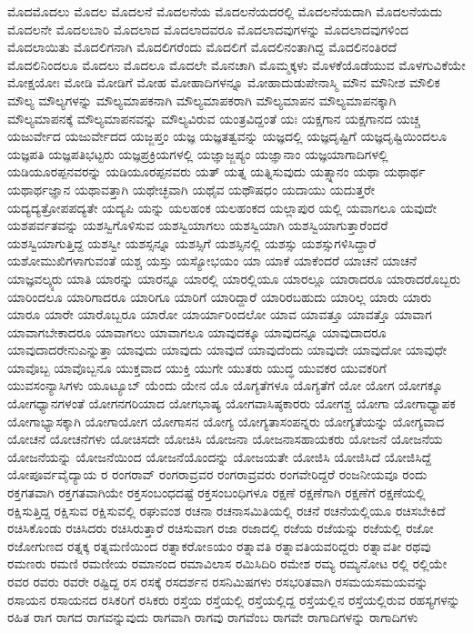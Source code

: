 {ಮೊದಮೊದಲು
ಮೊದಲ
ಮೊದಲನೆ
ಮೊದಲನೆಯ
ಮೊದಲನೆಯದರಲ್ಲಿ
ಮೊದಲನೆಯದಾಗಿ
ಮೊದಲನೆಯದು
ಮೊದಲನೇ
ಮೊದಲಬಾರಿ
ಮೊದಲಾದ
ಮೊದಲಾದವರೂ
ಮೊದಲಾದವುಗಳನ್ನು
ಮೊದಲಾದವುಗಳಿಂದ
ಮೊದಲಾಯಿತು
ಮೊದಲಿಗನಾಗಿ
ಮೊದಲಿಗರೆಂದು
ಮೊದಲಿಗೆ
ಮೊದಲಿನಂತಾಗಿದ್ದ
ಮೊದಲಿನಂತಿರದೆ
ಮೊದಲಿನಿಂದಲೂ
ಮೊದಲು
ಮೊದಲೂ
ಮೊದಲೇ
ಮೊನಚಾಗಿ
ಮೊಮ್ಮಕ್ಕಳು
ಮೊಳಕೆಯೊಡೆಯುವ
ಮೊಳಗುವಿಕೆಯೇ
ಮೋಕ್ಷಯೋಃ
ಮೋಡಿ
ಮೋಡಿಗೆ
ಮೋಹ
ಮೋಹಾದಿಗಳನ್ನೂ
ಮೋಹಾದುಡುಪೇನಾಸ್ಮಿ
ಮೌನ
ಮೌನೀಶ
ಮೌಲಿಕ
ಮೌಲ್ಯ
ಮೌಲ್ಯಗಳನ್ನು
ಮೌಲ್ಯಮಾಪಕನಾಗಿ
ಮೌಲ್ಯಮಾಪಕರಾಗಿ
ಮೌಲ್ಯಮಾಪನ
ಮೌಲ್ಯಮಾಪನಕ್ಕಾಗಿ
ಮೌಲ್ಯಮಾಪನಕ್ಕೆ
ಮೌಲ್ಯಮಾಪನವನ್ನು
ಮೌಲ್ಯವಿರುವ
ಯಂತ್ರವಿದ್ದಂತೆ
ಯಃ
ಯಕ್ಷಗಾನ
ಯಕ್ಷಗಾನದ
ಯಚ್ಚ
ಯಜುರ್ವೇದ
ಯಜುರ್ವೇದದ
ಯಜ್ಜಪ್ತಂ
ಯಜ್ಞ
ಯಜ್ಞತತ್ವವನ್ನು
ಯಜ್ಞದಲ್ಲಿ
ಯಜ್ಞದೃಷ್ಟಿಗೆ
ಯಜ್ಞದೃಷ್ಟಿಯಿಂದಲೂ
ಯಜ್ಞಪತಿ
ಯಜ್ಞಪತಿಭಟ್ಟರು
ಯಜ್ಞಪ್ರಕ್ರಿಯಗಳಲ್ಲಿ
ಯಜ್ಞಾಜ್ಜಪ್ಯಂ
ಯಜ್ಞಾನಾಂ
ಯಜ್ಞಯಾಗಾದಿಗಳಲ್ಲಿ
ಯಡಿಯೂರಪ್ಪನವರನ್ನು
ಯಡಿಯೂರಪ್ಪನವರು
ಯತ್
ಯತ್ನ
ಯತ್ನಿಸುವುದು
ಯತ್ಸ್ನಾನಂ
ಯಥಾ
ಯಥಾರ್ಥ
ಯಥಾರ್ಥಜ್ಞಾನ
ಯಥಾವತ್ತಾಗಿ
ಯಥೇಚ್ಛವಾಗಿ
ಯಥೈವ
ಯಥೌಷಧಂ
ಯದಾಯು
ಯದುತ್ತರೇ
ಯದ್ಯದ್ಯತ್ರೋಪಪದ್ಯತೇ
ಯದ್ಯಪಿ
ಯನ್ನು
ಯಲಹಂಕ
ಯಲಹಂಕದ
ಯಲ್ಲಾಪುರ
ಯಲ್ಲಿ
ಯವಾಗಲೂ
ಯವುದೇ
ಯಶಪರ್ವತವನ್ನು
ಯಶಸ್ವಿಗೊಳಿಸುವ
ಯಶಸ್ವಿಯಾಗಲು
ಯಶಸ್ವಿಯಾಗಿ
ಯಶಸ್ವಿಯಾಗುತ್ತಾರೆಂದರೆ
ಯಶಸ್ವಿಯಾಗುತ್ತಿದ್ದ
ಯಶಸ್ವೀ
ಯಶಸ್ಸನ್ನೂ
ಯಶಸ್ಸಿಗೆ
ಯಶಸ್ಸಿನಲ್ಲಿ
ಯಶಸ್ಸು
ಯಶಸ್ಸುಗಳಿಸಿದ್ದಾರೆ
ಯಶೋಮುಖಿಗಳಾಗುವಂತೆ
ಯಶ್ಚ
ಯಸ್ತು
ಯಸ್ಯೋಭಯಂ
ಯಾ
ಯಾಕೆ
ಯಾಕೆಂದರೆ
ಯಾಚನೆ
ಯಾಚನೆ
ಯಾಜ್ಞವಲ್ಕ್ಯರು
ಯಾತಿ
ಯಾರನ್ನು
ಯಾರನ್ನೂ
ಯಾರಲ್ಲಿ
ಯಾರಲ್ಲಿಯೂ
ಯಾರಲ್ಲೂ
ಯಾರಾದರೂ
ಯಾರಾದರೊಬ್ಬರು
ಯಾರಿಂದಲೂ
ಯಾರಿಗಾದರೂ
ಯಾರಿಗೂ
ಯಾರಿಗೆ
ಯಾರಿದ್ದಾರೆ
ಯಾರಿರಬಹುದು
ಯಾರಿಲ್ಲ
ಯಾರು
ಯಾರು
ಯಾರೂ
ಯಾರೇ
ಯಾರೊಬ್ಬರೂ
ಯಾರೋ
ಯಾರ್ಯಾರಿಂದಲೋ
ಯಾವ
ಯಾವತ್ತೂ
ಯಾವತ್ತೊ
ಯಾವಾಗ
ಯಾವಾಗಬೇಕಾದರೂ
ಯಾವಾಗಲು
ಯಾವಾಗಲೂ
ಯಾವುದಕ್ಕೂ
ಯಾವುದನ್ನೂ
ಯಾವುದಾದರೂ
ಯಾವುದಾದರೇನುಎನ್ನುತ್ತಾ
ಯಾವುದು
ಯಾವುದು
ಯಾವುದೆ
ಯಾವುದೆಂದು
ಯಾವುದೇ
ಯಾವುದೋ
ಯಾವುಧೇ
ಯಾವೊಬ್ಬ
ಯಾವೊಬ್ಬನೂ
ಯುಕ್ತವಾದ
ಯುಕ್ತಿ
ಯುಗೇ
ಯುತರು
ಯುದ್ಧ
ಯುವಕರ
ಯುವಕರಿಗೆ
ಯುವಸಂನ್ಯಾಸಿಗಳು
ಯೂಟ್ಯೂಬ್
ಯೆಂದು
ಯೇನ
ಯೊ
ಯೊಗ್ಯತೆಗಳೂ
ಯೊಗ್ಯತೆಗೆ
ಯೋ
ಯೋಗ
ಯೋಗಕ್ಕೂ
ಯೋಗಧ್ಯಾನಗಳಂತೆ
ಯೋಗನಗರಿಯಾದ
ಯೋಗಭಾಷ್ಯ
ಯೋಗವಾಸಿಷ್ಠಕಾರರು
ಯೋಗಶ್ಚ
ಯೋಗಾ
ಯೋಗಾಧ್ಯಾಪಕ
ಯೋಗಾಭ್ಯಾಸಕ್ಕಾಗಿ
ಯೋಗಾಯೋಗ
ಯೋಗಾಸನ
ಯೋಗ್ಯ
ಯೋಗ್ಯತಾಸಂಪನ್ನರು
ಯೋಗ್ಯತೆಯನ್ನು
ಯೋಗ್ಯವಾದ
ಯೋಚನೆ
ಯೋಚನೆಗಳು
ಯೋಚಿಸದೇ
ಯೋಚಿಸಿ
ಯೋಜನಾ
ಯೋಜನಾಸಹಾಯಕರು
ಯೋಜನೆ
ಯೋಜನೆಯ
ಯೋಜನೆಯನ್ನು
ಯೋಜನೆಯಿಂದ
ಯೋಜನೆಯೊಂದನ್ನು
ಯೋಜಯತೇ
ಯೋಜಿಸಿ
ಯೋಜಿಸಿದೆ
ಯೋಜಿಸಿದ್ದೆ
ಯೋಪೂರ್ವವೈದ್ಯಾಯ
ರ
ರಂಗರಾವ್
ರಂಗರಾವ್ರವರ
ರಂಗರಾವ್ರವರು
ರಂಗವೇರಿದ್ದರೆ
ರಂಜನೀಯವೂ
ರಂದು
ರಕ್ತಗತವಾಗಿ
ರಕ್ತಗತವಾಗಿಯೇ
ರಕ್ತಸಂಬಂಧದಷ್ಟೆ
ರಕ್ತಸಂಬಂಧಿಗಳೂ
ರಕ್ಷಣೆ
ರಕ್ಷಣೆಗಾಗಿ
ರಕ್ಷಣೆಗೆ
ರಕ್ಷಣೆಯಲ್ಲಿ
ರಕ್ಷಿಸುತ್ತಿದ್ದ
ರಕ್ಷಿಸುವ
ರಕ್ಷಿಸುವಲ್ಲಿ
ರಘುವಂಶ
ರಚನಾ
ರಚನಾಸಮಿತಿಯಲ್ಲಿ
ರಚನೆ
ರಚನೆಯಲ್ಲಿಯೂ
ರಚಿಸಬೇಕಿದೆ
ರಚಿಸಿಕೊಂಡು
ರಚಿಸಿದರು
ರಚಿಸಿರುತ್ತಾರೆ
ರಚಿಸುವಾಗ
ರಜಾ
ರಜಾದಲ್ಲಿ
ರಜೆಯ
ರಜೆಯನ್ನು
ರಜೆಯಲ್ಲಿ
ರಜೋ
ರಜೋಗುಣದ
ರತ್ನಕ್ಕ
ರತ್ನಮಣಿಯಿಂದ
ರತ್ನಾಕರೋಽಯಂ
ರತ್ನಾವತಿ
ರತ್ನಾವತಿಯವರಿದ್ದರು
ರತ್ನಾವತೀ
ರಥವು
ರಮಣರು
ರಮಣಿ
ರಮಣೀಯ
ರಮಾನಂದ
ರಮಾವಿಲಾಸ
ರಮಿಸಿದಿರಿ
ರಮೇಶ
ರಮ್ಯ
ರಮ್ಯನೋಟ
ರಲ್ಲಿ
ರಲ್ಲಿಯೇ
ರವರ
ರವರು
ರವರೇ
ರಷ್ಟಿದ್ದ
ರಸ
ರಸಕ್ಕೆ
ರಸದರ್ಶನ
ರಸನಿಮಿಷಗಳು
ರಸಭರಿತವಾಗಿ
ರಸಮಯಸಮಯವನ್ನು
ರಸಾಯನ
ರಸಾಯನದ
ರಸಿಕರಿಗೆ
ರಸಿಕರು
ರಸ್ತೆಯ
ರಸ್ತೆಯಲ್ಲಿ
ರಸ್ತೆಯಲ್ಲಿದ್ದ
ರಸ್ತೆಯಲ್ಲಿನ
ರಸ್ತೆಯಲ್ಲಿರುವ
ರಹಸ್ಯಗಳನ್ನು
ರಹಿತ
ರಾಗ
ರಾಗದ
ರಾಗವನ್ನುವುದು
ರಾಗವಾಗಿ
ರಾಗವು
ರಾಗವೆಂಬ
ರಾಗವೇ
ರಾಗಾದಿಗಳನ್ನು
ರಾಗಾದಿಗಳು
}

